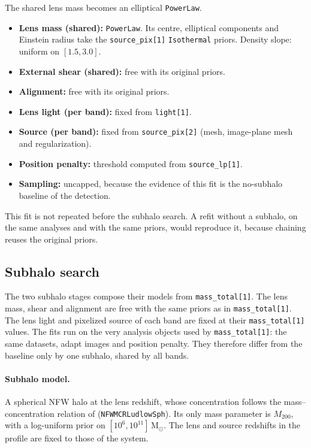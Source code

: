 The shared lens mass becomes an elliptical \texttt{PowerLaw}.
\begin{itemize}
    \item \textbf{Lens mass (shared):} \texttt{PowerLaw}. Its centre, elliptical components and
    Einstein radius take the \texttt{source\_pix[1]} \texttt{Isothermal} priors. Density slope:
    uniform on $[1.5, 3.0]$.
    \item \textbf{External shear (shared):} free with its original priors.
    \item \textbf{Alignment:} free with its original priors.
    \item \textbf{Lens light (per band):} fixed from \texttt{light[1]}.
    \item \textbf{Source (per band):} fixed from \texttt{source\_pix[2]} (mesh, image-plane mesh
    and regularization).
    \item \textbf{Position penalty:} threshold computed from \texttt{source\_lp[1]}.
    \item \textbf{Sampling:} uncapped, because the evidence of this fit is the no-subhalo baseline
    of the detection.
\end{itemize}
This fit is not repeated before the subhalo search. A refit without a subhalo, on the same analyses
and with the same priors, would reproduce it, because chaining reuses the original priors.

\subsection{\label{sc:pipeline_subhalo}Subhalo search}

The two subhalo stages compose their models from \texttt{mass\_total[1]}. The lens mass, shear and
alignment are free with the same priors as in \texttt{mass\_total[1]}. The lens light and pixelized
source of each band are fixed at their \texttt{mass\_total[1]} values. The fits run on the very
analysis objects used by \texttt{mass\_total[1]}: the same datasets, adapt images and position
penalty. They therefore differ from the baseline only by one subhalo, shared by all bands.

\paragraph{Subhalo model.} A spherical NFW halo at the lens redshift, whose concentration follows
the mass--concentration relation of \citet{Ludlow2016} (\texttt{NFWMCRLudlowSph}). Its only mass
parameter is $M_{200}$, with a log-uniform prior on $[10^6, 10^{11}]\,\mathrm{M}_\odot$. The lens
and source redshifts in the profile are fixed to those of the system.

